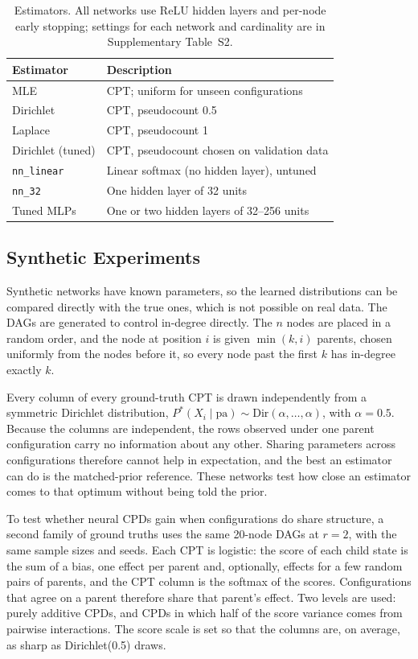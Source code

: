 \documentclass[a4paper,fleqn]{cas-dc}
\begin{document}
\begin{table}[tbp]
\caption{Estimators. All networks use ReLU hidden layers and per-node early stopping; settings for each network and cardinality are in Supplementary Table~S2.}\label{tab:estimators}
\begin{tabular*}{\tblwidth}{@{\extracolsep{\fill}}ll@{}}
\toprule
Estimator & Description \\
\midrule
MLE & CPT; uniform for unseen configurations \\
Dirichlet & CPT, pseudocount 0.5 \\
Laplace & CPT, pseudocount 1 \\
Dirichlet (tuned) & CPT, pseudocount chosen on validation data \\
\texttt{nn\_linear} & Linear softmax (no hidden layer), untuned \\
\texttt{nn\_32} & One hidden layer of 32 units \\
Tuned MLPs & One or two hidden layers of 32--256 units \\
\bottomrule
\end{tabular*}
\end{table}

\subsection{Synthetic Experiments}\label{sec:synthetic}

Synthetic networks have known parameters, so the learned distributions can be compared directly with the true ones, which is not possible on real data. The DAGs are generated to control in-degree directly. The $n$ nodes are placed in a random order, and the node at position $i$ is given $\min(k,i)$ parents, chosen uniformly from the nodes before it, so every node past the first $k$ has in-degree exactly $k$.

Every column of every ground-truth CPT is drawn independently from a symmetric Dirichlet distribution, $P^*(X_i\mid \mathrm{pa}) \sim \mathrm{Dir}(\alpha,\dots,\alpha)$, with $\alpha=0.5$. Because the columns are independent, the rows observed under one parent configuration carry no information about any other. Sharing parameters across configurations therefore cannot help in expectation, and the best an estimator can do is the matched-prior reference. These networks test how close an estimator comes to that optimum without being told the prior.

To test whether neural CPDs gain when configurations do share structure, a second family of ground truths uses the same 20-node DAGs at $r=2$, with the same sample sizes and seeds. Each CPT is logistic: the score of each child state is the sum of a bias, one effect per parent and, optionally, effects for a few random pairs of parents, and the CPT column is the softmax of the scores. Configurations that agree on a parent therefore share that parent's effect. Two levels are used: purely additive CPDs, and CPDs in which half of the score variance comes from pairwise interactions. The score scale is set so that the columns are, on average, as sharp as Dirichlet(0.5) draws.
\end{document}

